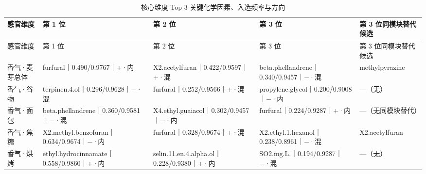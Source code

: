 \documentclass[11pt,a4paper]{article}
\renewcommand{\arraystretch}{1.12}
\newenvironment{bpLTsmall}{\small\renewcommand{\arraystretch}{1.02}}{}
\renewcommand{\arraystretch}{0.90}
\begin{document}
\begin{bpLTsmall}
\setcounter{table}{6}
\begin{longtable}{@{}>{\raggedright\arraybackslash}p{}>{\raggedright\arraybackslash}p{}>{\raggedright\arraybackslash}p{}>{\raggedright\arraybackslash}p{}>{\raggedright\arraybackslash}p{}@{}}
\caption{核心维度 Top-3 关键化学因素、入选频率与方向}\label{tab:q2-core-top3}\\
\toprule
感官维度 & 第 1 位 & 第 2 位 & 第 3 位 & 第 3 位同模块替代候选 \\
\midrule
\endfirsthead
\toprule
感官维度 & 第 1 位 & 第 2 位 & 第 3 位 & 第 3 位同模块替代候选 \\
\midrule
\endhead
\bottomrule
\endfoot
香气·\allowbreak{}麦芽总体 & furfural｜\allowbreak{}0.490/\allowbreak{}0.9767｜\allowbreak{}+·\allowbreak{}内 & X2.acetylfuran｜\allowbreak{}0.422/\allowbreak{}0.9597｜\allowbreak{}+·\allowbreak{}混 & beta.\allowbreak{}phellandrene｜\allowbreak{}0.340/\allowbreak{}0.9457｜\allowbreak{}−·\allowbreak{}混 & methylpyrazine \\
香气·\allowbreak{}谷物 & terpinen.4.ol｜\allowbreak{}0.296/\allowbreak{}0.9628｜\allowbreak{}−·\allowbreak{}混 & furfural｜\allowbreak{}0.252/\allowbreak{}0.9566｜\allowbreak{}+·\allowbreak{}混 & propylene.\allowbreak{}glycol｜\allowbreak{}0.200/\allowbreak{}0.9008｜\allowbreak{}−·\allowbreak{}内 & —（无） \\
香气·\allowbreak{}面包 & beta.\allowbreak{}phellandrene｜\allowbreak{}0.360/\allowbreak{}0.9581｜\allowbreak{}−·\allowbreak{}混 & X4.ethyl.\allowbreak{}guaiacol｜\allowbreak{}0.302/\allowbreak{}0.9457｜\allowbreak{}−·\allowbreak{}内 & furfural｜\allowbreak{}0.224/\allowbreak{}0.9287｜\allowbreak{}+·\allowbreak{}内 & —（无同模块替代） \\
香气·\allowbreak{}焦糖 & X2.methyl.\allowbreak{}benzofuran｜\allowbreak{}0.634/\allowbreak{}0.9674｜\allowbreak{}−·\allowbreak{}内 & furfural｜\allowbreak{}0.328/\allowbreak{}0.9674｜\allowbreak{}+·\allowbreak{}混 & X2.ethyl.1.hexanol｜\allowbreak{}0.238/\allowbreak{}0.8961｜\allowbreak{}−·\allowbreak{}混 & X2.acetylfuran \\
香气·\allowbreak{}烘烤 & ethyl.\allowbreak{}hydrocinnamate｜\allowbreak{}0.558/\allowbreak{}0.9860｜\allowbreak{}+·\allowbreak{}内 & selin.11.en.4.alpha.\allowbreak{}ol｜\allowbreak{}0.228/\allowbreak{}0.9380｜\allowbreak{}+·\allowbreak{}内 & SO2.mg.\allowbreak{}L.｜\allowbreak{}0.194/\allowbreak{}0.9287｜\allowbreak{}−·\allowbreak{}混 & —（无） \\

\end{longtable}
\end{bpLTsmall}
\end{document}
